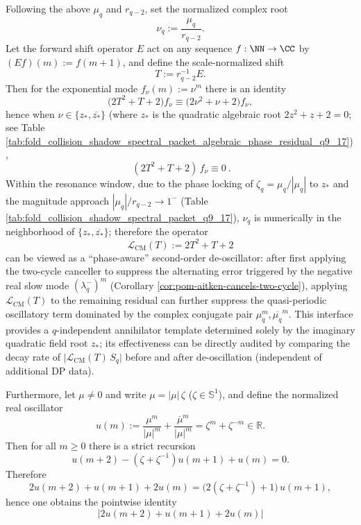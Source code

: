 \begin{remark}\label{rem:pom-cm-annihilator}
Following the above \(\mu_q\) and \(r_{q-2}\), set the normalized complex root
\[
\nu_q:=\frac{\mu_q}{r_{q-2}}.
\]
Let the forward shift operator \(E\) act on any sequence \(f:\NN\to\CC\) by \((Ef)(m):=f(m+1)\), and define the scale-normalized shift
\[
T:=r_{q-2}^{-1}E.
\]
Then for the exponential mode \(f_\nu(m):=\nu^{m}\) there is an identity
\[
\bigl(2T^2+T+2\bigr)f_\nu
\equiv
\bigl(2\nu^2+\nu+2\bigr)f_\nu,
\]
hence when \(\nu\in\{z_\ast,\overline{z_\ast}\}\) (where \(z_\ast\) is the quadratic algebraic root \(2z^2+z+2=0\); see Table \ref{tab:fold_collision_shadow_spectral_packet_algebraic_phase_residual_q9_17}),
\[
\boxed{\ (2T^2+T+2)\,f_\nu\equiv 0\ }.
\]
Within the resonance window, due to the phase locking of \(\zeta_q=\mu_q/|\mu_q|\) to \(z_\ast\) and the magnitude approach \(|\mu_q|/r_{q-2}\to 1^{-}\) (Table \ref{tab:fold_collision_shadow_spectral_packet_q9_17}), \(\nu_q\) is numerically in the neighborhood of \(\{z_\ast,\overline{z_\ast}\}\);
therefore the operator
\[
\boxed{\ \mathcal L_{\mathrm{CM}}(T):=2T^2+T+2\ }
\]
can be viewed as a ``phase-aware'' second-order de-oscillator: after first applying the two-cycle canceller to suppress the alternating error triggered by the negative real slow mode \((\lambda_q^-)^m\) (Corollary \ref{cor:pom-aitken-cancels-two-cycle}), applying \(\mathcal L_{\mathrm{CM}}(T)\) to the remaining residual can further suppress the quasi-periodic oscillatory term dominated by the complex conjugate pair \(\mu_q^m,\overline{\mu_q}^m\).
This interface provides a \(q\)-independent annihilator template determined solely by the imaginary quadratic field root \(z_\ast\); its effectiveness can be directly audited by comparing the decay rate of
\(
\bigl|\mathcal L_{\mathrm{CM}}(T)\,S_q\bigr|
\)
before and after de-oscillation (independent of additional DP data).
\par
Furthermore, let \(\mu\ne 0\) and write \(\mu=|\mu|\,\zeta\) (\(\zeta\in\mathbb{S}^1\)), and define the normalized real oscillator
\[
u(m):=\frac{\mu^{m}}{|\mu|^{m}}+\frac{\overline{\mu}^{m}}{|\mu|^{m}}
=\zeta^{m}+\zeta^{-m}\in\mathbb{R}.
\]
Then for all \(m\ge 0\) there is a strict recursion
\[
u(m+2)-(\zeta+\zeta^{-1})u(m+1)+u(m)=0.
\]
Therefore
\[
2u(m+2)+u(m+1)+2u(m)=\bigl(2(\zeta+\zeta^{-1})+1\bigr)\,u(m+1),
\]
hence one obtains the pointwise identity
\[
\bigl|2u(m+2)+u(m+1)+2u(m)\bigr|
\]
\end{remark}
